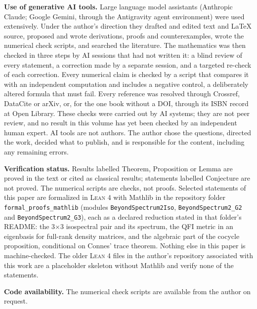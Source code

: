 \documentclass[11pt,a4paper,reqno]{amsart}
\theoremstyle{definition}
\numberwithin{equation}{section}
\begin{document}
\medskip\noindent\textbf{Use of generative AI tools.} Large language model
assistants (Anthropic Claude; Google Gemini, through the Antigravity agent
environment) were used extensively. Under the author's direction they drafted and
edited text and \LaTeX{} source, proposed and wrote derivations, proofs and
counterexamples, wrote the numerical check scripts, and searched the literature.
The mathematics was then checked in three steps by AI sessions that had not
written it: a blind review of every statement, a correction made by a separate
session, and a targeted re-check of each correction. Every numerical claim is
checked by a script that compares it with an independent computation and includes
a negative control, a deliberately altered formula that must fail. Every reference
was resolved through Crossref, DataCite or arXiv, or, for the one book without
a DOI, through its ISBN record at Open Library. These checks were carried out by
AI systems; they are not peer review, and no result in this volume has yet
been checked by an independent human expert. AI tools are not authors. The author
chose the questions, directed the work, decided what to publish, and is
responsible for the content, including any remaining errors.

\medskip\noindent\textbf{Verification status.} Results labelled Theorem,
Proposition or Lemma are proved in the text or cited as classical results;
statements labelled Conjecture are not proved. The numerical scripts are checks,
not proofs. Selected statements of this paper are formalized in \textsc{Lean 4} with Mathlib in the repository folder \texttt{formal\_proofs\_mathlib} (modules \texttt{BeyondSpectrum2Iso}, \texttt{BeyondSpectrum2\_G2} and \texttt{BeyondSpectrum2\_G3}), each as a declared reduction stated in that folder's README: the 3$\times$3 isospectral pair and its spectrum, the QFI metric in an eigenbasis for full-rank density matrices, and the algebraic part of the cocycle proposition, conditional on Connes' trace theorem. Nothing else in this paper is machine-checked. The older \textsc{Lean 4} files in the author's repository associated with
this work are a placeholder skeleton without Mathlib and verify none of the
statements.

\medskip\noindent\textbf{Code availability.} The numerical check scripts are
available from the author on request.
\end{document}
